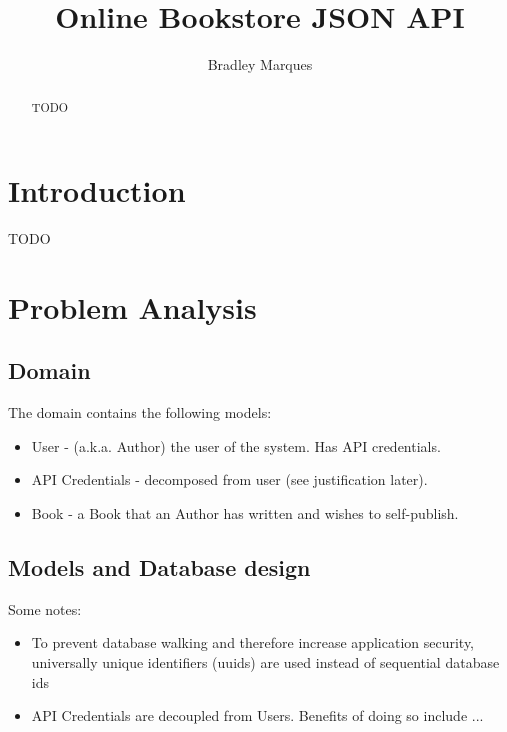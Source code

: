 \documentclass[a4paper]{article}
\title{Online Bookstore JSON API}
\author{Bradley Marques}
\begin{document}
\maketitle

\newpage

\begin{abstract}
	TODO
\end{abstract}

\newpage

\tableofcontents

\newpage

\section{Introduction}

TODO

\section{Problem Analysis}

\subsection{Domain}

The domain contains the following models:

\begin{itemize}
  \item User - (a.k.a. Author) the user of the system. Has API credentials.
  \item API Credentials - decomposed from user (see justification later).
  \item Book - a Book that an Author has written and wishes to self-publish.
\end{itemize}

\subsection{Models and Database design}

Some notes:

\begin{itemize}
  \item To prevent database walking and therefore increase application security,
  universally unique identifiers (uuids) are used instead of sequential database
  ids
  \item API Credentials are decoupled from Users. Benefits of doing so include ...
\end{itemize}
\end{document}
